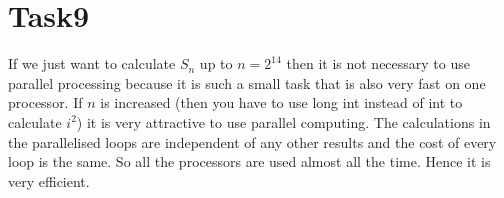 \documentclass[11pt,titlepage] {article}
\begin{document}
\section{Task9}
If we just want to calculate $S_n$ up to $n=2^{14}$ then it is not necessary to use parallel processing because it is such a small task that is also very fast on one processor. If $n$ is increased (then you have to use long int instead of int to calculate $i^2$) it is very attractive to use parallel computing. The calculations in the parallelised loops are independent of any other results and the cost of every loop is the same. So all the processors are used almost all the time. Hence it is very efficient. 
\end{document}
